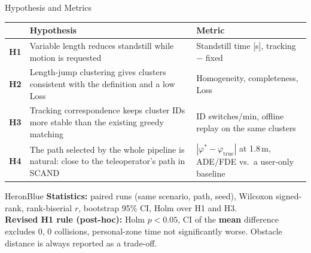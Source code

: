 \documentclass[aspectratio=169,11pt]{beamer}
\newif\ifshownotes
\begin{document}
\ifshownotes
\begin{frame}{Pipeline Speaker Notes}
Οι παραπάνω διαφορές καθορίζουν το pipeline στο οποίο καταλήξαμε.
\begin{itemize}
  \item Ο generator δίνει τα paths με το ελεύθερο μήκος τους.
  \item Το clustering χωρίζει τις επιλογές και κρατά σταθερά IDs.
  \item Ο intent estimator μένει ίδιος και επιλέγει cluster από την εντολή του χρήστη.
  \item Ο shared controller βγάζει $v$ και $\omega$ και στέλνει πίσω την απαίτηση φρεναρίσματος στο clustering.
  \item Velocity smoother, collision monitor του NAV2 και custom watchdog εφαρμόζονται και στις δύο μεθόδους.
\end{itemize}
\end{frame}
\fi

\begin{frame}{Hypothesis and Metrics}
  \footnotesize
  \renewcommand{\arraystretch}{1.3}
  \begin{tabularx}{\textwidth}{@{}L{1.0cm}YL{5.2cm}@{}}
    \toprule
    & \textbf{Hypothesis} & \textbf{Metric}\\
    \midrule
    \textbf{H1} & Variable length reduces standstill while motion is requested & Standstill time [s], tracking $-$ fixed\\
    \textbf{H2} & Length-jump clustering gives clusters consistent with the definition and a low Loss & Homogeneity, completeness, Loss\\
    \textbf{H3} & Tracking correspondence keeps cluster IDs more stable than the existing greedy matching & ID switches/min, offline replay on the same clusters\\
    \textbf{H4} & The path selected by the whole pipeline is natural: close to the teleoperator's path in SCAND & $|\varphi^{*}-\varphi_{\mathrm{true}}|$ at 1.8\,m, ADE/FDE vs.\ a user-only baseline\\
    \bottomrule
  \end{tabularx}

  \vspace{0.2cm}
  \begin{statusbox}{HeronBlue}
    \scriptsize\textbf{Statistics:} paired runs (same scenario, path, seed), Wilcoxon signed-rank, rank-biserial $r$, bootstrap 95\% CI, Holm over H1 and H3.\\[2pt]
    \textbf{Revised H1 rule (post-hoc):} Holm $p<0.05$, CI of the \textbf{mean} difference excludes 0, 0 collisions, personal-zone time not significantly worse. Obstacle distance is always reported as a trade-off.
  \end{statusbox}
\end{frame}
\end{document}

